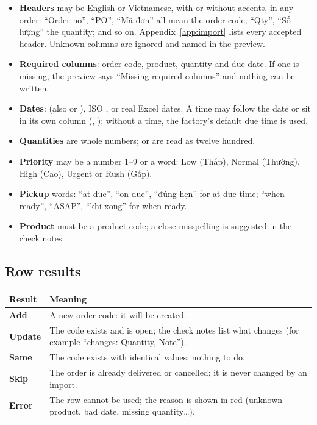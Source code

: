 \begin{itemize}
  \item \textbf{Headers} may be English or Vietnamese, with or without accents, in any order: ``Order no'',
        ``PO'', ``Mã đơn'' all mean the order code; ``Qty'', ``Số lượng'' the quantity; and so on.
        Appendix~\ref{app:import} lists every accepted header. Unknown columns are ignored and named in
        the preview.
  \item \textbf{Required columns}: order code, product, quantity and due date. If one is missing, the preview
        says ``Missing required columns'' and nothing can be written.
  \item \textbf{Dates}:  (also  or ), ISO
        , or real Excel dates. A time may follow the date or sit in its own column
        (, ); without a time, the factory's default due time is used.
  \item \textbf{Quantities} are whole numbers;  or  are read as twelve hundred.
  \item \textbf{Priority} may be a number 1--9 or a word: Low (Thấp), Normal (Thường), High (Cao), Urgent or
        Rush (Gấp).
  \item \textbf{Pickup} words: ``at due'', ``on due'', ``đúng hẹn'' for at due time; ``when ready'',
        ``ASAP'', ``khi xong'' for when ready.
  \item \textbf{Product} must be a product code; a close misspelling is suggested in the check notes.
\end{itemize}

\subsection{Row results}

\begin{center}
\begin{tabularx}{\linewidth}{>{\bfseries}p{2.4cm}X}
\toprule
\rowcolor{white}Result & Meaning \\
\midrule
Add & A new order code: it will be created. \\
Update & The code exists and is open; the check notes list what changes (for example ``changes: Quantity, Note''). \\
Same & The code exists with identical values; nothing to do. \\
Skip & The order is already delivered or cancelled; it is never changed by an import. \\
Error & The row cannot be used; the reason is shown in red (unknown product, bad date, missing quantity\dots). \\
\bottomrule
\end{tabularx}
\end{center}

